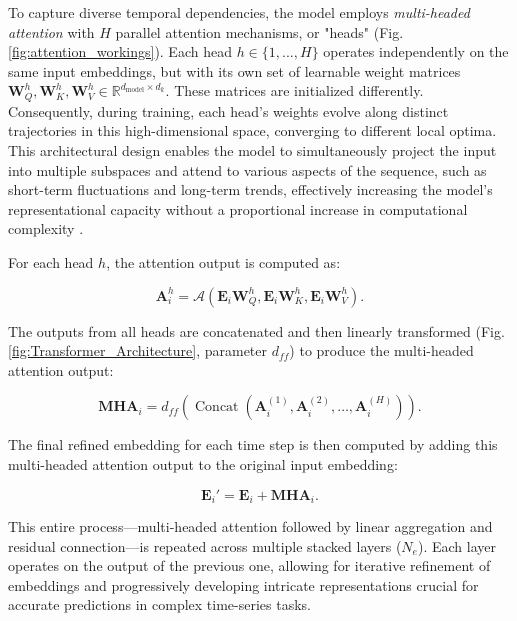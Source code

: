 To capture diverse temporal dependencies, the model employs \textit{multi-headed attention} with $H$ parallel attention mechanisms, or "heads" (Fig. \ref{fig:attention_workings}). Each head $h \in \{1, ..., H\}$ operates independently on the same input embeddings, but with its own set of learnable weight matrices $\mathbf{W}_Q^h, \mathbf{W}_K^h, \mathbf{W}_V^h \in \mathbb{R}^{d_{\text{model}} \times d_k}$. These matrices are initialized differently. Consequently, during training, each head's weights evolve along distinct trajectories in this high-dimensional space, converging to different local optima. This architectural design enables the model to simultaneously project the input into multiple subspaces and attend to various aspects of the sequence, such as short-term fluctuations and long-term trends, effectively increasing the model's representational capacity without a proportional increase in computational complexity \cite{vaswani2017attention}.

For each head $h$, the attention output is computed as:

\begin{equation}
    \mathbf{A}_i^h = \mathcal{A}(\mathbf{E}_i\mathbf{W}_Q^h, \mathbf{E}_i\mathbf{W}_K^h, \mathbf{E}_i\mathbf{W}_V^h).
\end{equation}

The outputs from all heads are concatenated and then linearly transformed (Fig. \ref{fig:Transformer_Architecture}, parameter $d_{ff}$) to produce the multi-headed attention output:

\begin{equation}
    \mathbf{MHA}_i = d_{ff}(\operatorname{Concat}(\mathbf{A}_i^{(1)}, \mathbf{A}_i^{(2)}, \ldots, \mathbf{A}_i^{(H)})).
\end{equation}

The final refined embedding for each time step is then computed by adding this multi-headed attention output to the original input embedding:

\begin{equation}
    \mathbf{E}_i' = \mathbf{E}_i + \mathbf{MHA}_i.
\end{equation}

This entire process—multi-headed attention followed by linear aggregation and residual connection—is repeated across multiple stacked layers ($N_e$). Each layer operates on the output of the previous one, allowing for iterative refinement of embeddings and progressively developing intricate representations crucial for accurate predictions in complex time-series tasks.